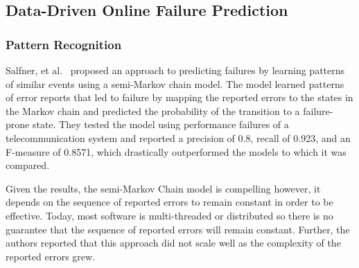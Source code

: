 \figpatternRecognition{6in}

\subsection{Data-Driven Online Failure Prediction}

\subsubsection{Pattern Recognition}
Salfner, et al.~\cite{salfner2006} proposed an approach to predicting failures
by learning patterns of similar events using a semi-Markov chain model.
The model learned patterns of error reports that led to failure by mapping the
reported errors to the states in the Markov chain and predicted the probability
of the transition to a failure-prone state.  They tested the model using
performance failures of a telecommunication system and reported a precision of
0.8, recall of 0.923, and an F-measure of 0.8571, which drastically
outperformed the models to which it was compared.

Given the results, the semi-Markov Chain model is compelling however, it
depends on the sequence of reported errors to remain constant in order to be
effective.  Today, most software is multi-threaded or distributed so there is
no guarantee that the sequence of reported errors will remain constant.
Further, the authors reported that this approach did not scale well as the
complexity of the reported errors grew.

